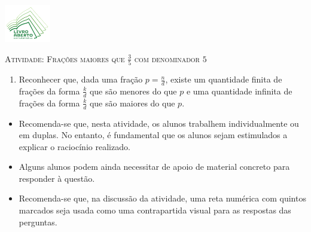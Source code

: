 \documentclass[10 pt,usenames,dvipsnames, oneside]{article}
\begin{document}
\begin{center}
  \begin{minipage}[l]{3cm}
\includegraphics[width=2cm]{../../../Figuras/logo}       
\end{minipage}\hfill
\begin{minipage}[r]{.8\textwidth}
 {\Large \scshape Atividade: Frações maiores que $\frac{3}{5}$ com denominador $5$}  
\end{minipage}
\end{center}
\vspace{.2cm}

\ifdefined\prof
\begin{goals}
\begin{enumerate}
\item       Reconhecer que, dada uma fração       $p = \frac{n}{d}$, existe
um quantidade finita de frações da forma       $\frac{k}{d}$       que são
menores do que       $p$       e uma quantidade infinita de frações da forma
$\frac{k}{d}$       que são maiores do que       $p$.
\end{enumerate}

\tcblower

\begin{itemize}
\item       Recomenda-se que, nesta atividade, os alunos trabalhem
individualmente ou em duplas. No entanto, é fundamental que os alunos sejam
estimulados a explicar o raciocínio realizado.
\item       Alguns alunos podem ainda necessitar de apoio de material
concreto para responder à questão.
\item       Recomenda-se que, na discussão da atividade, uma reta numérica
com quintos marcados seja usada como uma contrapartida visual para as respostas
das perguntas.
\end{itemize}

\begin{center}
\end{center}
\end{goals}
\end{document}

